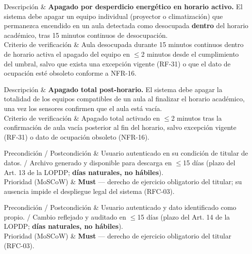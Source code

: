 Descripci\'on & \textbf{Apagado por desperdicio energ\'etico en horario activo.} El sistema debe apagar un equipo individual (proyector o climatizaci\'on) que permanezca encendido en un aula detectada como desocupada \textbf{dentro} del horario acad\'emico, tras 15 minutos continuos de desocupaci\'on. \\ \hline
Criterio de verificaci\'on & Aula desocupada durante 15 minutos continuos dentro de horario activa el apagado del equipo en $\leq$2 minutos desde el cumplimiento del umbral, salvo que exista una excepci\'on vigente (RF-31) o que el dato de ocupaci\'on est\'e obsoleto conforme a NFR-16. \\ \hline

Descripci\'on & \textbf{Apagado total post-horario.} El sistema debe apagar la totalidad de los equipos compatibles de un aula al finalizar el horario acad\'emico, una vez los sensores confirmen que el aula est\'a vac\'ia. \\ \hline
Criterio de verificaci\'on & Apagado total activado en $\leq$2 minutos tras la confirmaci\'on de aula vac\'ia posterior al fin del horario, salvo excepci\'on vigente (RF-31) o dato de ocupaci\'on obsoleto (NFR-16). \\ \hline

Precondici\'on / Postcondici\'on & Usuario autenticado en su condici\'on de titular de datos. / Archivo generado y disponible para descarga en $\leq$15 d\'ias (plazo del Art. 13 de la LOPDP; \textbf{d\'ias naturales, no h\'abiles}). \\ \hline
Prioridad (MoSCoW) & \textbf{Must} --- derecho de ejercicio obligatorio del titular; su ausencia impide el despliegue legal del sistema (RFC-03). \\ \hline

Precondici\'on / Postcondici\'on & Usuario autenticado y dato identificado como propio. / Cambio reflejado y auditado en $\leq$15 d\'ias (plazo del Art. 14 de la LOPDP; \textbf{d\'ias naturales, no h\'abiles}). \\ \hline
Prioridad (MoSCoW) & \textbf{Must} --- derecho de ejercicio obligatorio del titular (RFC-03). \\ \hline


